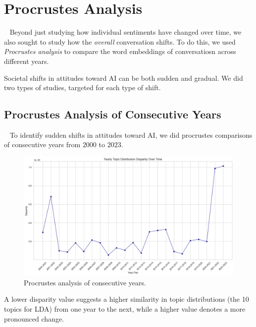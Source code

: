 \section{Procrustes Analysis}~\label{sec:procrustes}
Beyond just studying how individual sentiments have changed over time,
we also sought to study how the \emph{overall} conversation shifts.
To do this, we used \emph{Procrustes analysis} to compare the
word embeddings of conversatiosn across different years.

Societal shifts in attitudes toward AI can be both sudden and gradual.
We did two types of studies, targeted for each type of shift.

\subsection{Procrustes Analysis of Consecutive Years}~\label{subsec:procrustes-consecutive}
To identify sudden shifts in attitudes toward AI, we did procrustes comparisons
of consecutive years from $2000$ to $2023$.

\begin{figure}[h]
  \centering
  \includegraphics[width=\textwidth]{figures/procrustes/procrustes-consecutive.png}
  \caption{Procrustes analysis of consecutive years.}
  \label{fig:procrustes-consecutive}
\end{figure}

A lower disparity value suggests a higher similarity in topic distributions
(the 10 topics for LDA) from one year to the next, while a higher value denotes a more pronounced change.

